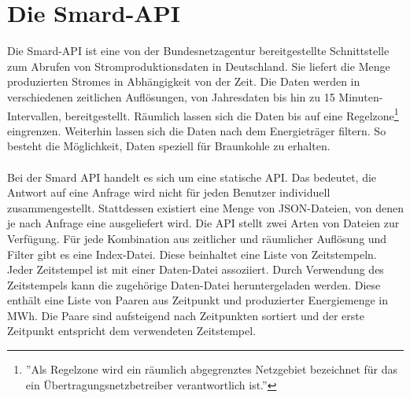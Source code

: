 \section{Die Smard-API}

Die Smard-API\cite{noauthor_bundesapismard-api_nodate} ist eine von der Bundesnetzagentur bereitgestellte Schnittstelle zum Abrufen von Stromproduktionsdaten in Deutschland. Sie liefert die Menge produzierten Stromes in Abhängigkeit von der Zeit. Die Daten werden in verschiedenen zeitlichen Auflösungen, von Jahresdaten bis hin zu 15 Minuten-Intervallen, bereitgestellt. Räumlich lassen sich die Daten bis auf eine Regelzone\footnote{''Als Regelzone wird ein räumlich abgegrenztes Netzgebiet bezeichnet für das ein Übertragungsnetzbetreiber verantwortlich ist.''\cite{noauthor_smard_nodate}} eingrenzen. Weiterhin lassen sich die Daten nach dem Energieträger filtern. So besteht die Möglichkeit, Daten speziell für Braunkohle zu erhalten.\\
\\
Bei der Smard API handelt es sich um eine statische API. Das bedeutet, die Antwort auf eine Anfrage wird nicht für jeden Benutzer individuell zusammengestellt. Stattdessen existiert eine Menge von JSON-Dateien, von denen je nach Anfrage eine ausgeliefert wird. Die API stellt zwei Arten von Dateien zur Verfügung. Für jede Kombination aus zeitlicher und räumlicher Auflösung und Filter gibt es eine Index-Datei. Diese beinhaltet eine Liste von Zeitstempeln. Jeder Zeitstempel ist mit einer Daten-Datei assoziiert. Durch Verwendung des Zeitstempels kann die zugehörige Daten-Datei heruntergeladen werden. Diese enthält eine Liste von Paaren aus Zeitpunkt und produzierter Energiemenge in MWh. Die Paare sind aufsteigend nach Zeitpunkten sortiert und der erste Zeitpunkt entspricht dem verwendeten Zeitstempel.